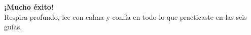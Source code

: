 \documentclass[12pt, letterpaper]{article}
\begin{document}
\vspace{14pt}
\begin{center}
  {\Large\bfseries\color{mwprimario} ¡Mucho éxito!}\\[4pt]
  {\large\color{gray} Respira profundo, lee con calma y confía en todo lo que practicaste en las seis guías.}
\end{center}
\end{document}
